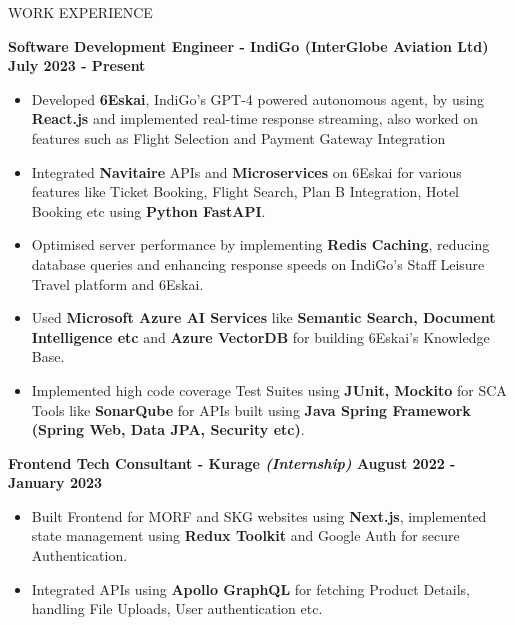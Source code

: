 \documentclass{resume} %
\begin{document}





\begin{rSection}{WORK EXPERIENCE}

{\bf Software Development Engineer - IndiGo (InterGlobe Aviation Ltd)  \hfill July 2023 - Present }
\begin{itemize}
    \item {\normalfont Developed \textbf{6Eskai}, IndiGo's GPT-4 powered autonomous agent, by using \textbf{React.js} and implemented real-time response streaming, also worked on features such as Flight Selection and Payment Gateway Integration}
    \item{\normalfont Integrated \textbf{Navitaire} APIs and \textbf{Microservices} on 6Eskai for various features like Ticket Booking, Flight Search, Plan B Integration, Hotel Booking etc using \textbf{Python FastAPI}.}
    \item {\normalfont Optimised server performance by implementing \textbf{Redis Caching}, reducing database queries and enhancing response speeds on IndiGo’s Staff Leisure Travel platform and 6Eskai.}
    \item {\normalfont Used \textbf{Microsoft Azure AI Services} like \textbf{Semantic Search, Document Intelligence etc} and \textbf{Azure VectorDB} for building 6Eskai's Knowledge Base.}
    \item {\normalfont Implemented high code coverage Test Suites using \textbf{JUnit, Mockito} for SCA Tools like \textbf{SonarQube} for APIs built using \textbf{Java Spring Framework (Spring Web, Data JPA, Security etc)}.}
\end{itemize}


{\bf Frontend Tech Consultant - Kurage {\normalfont \emph{(Internship)}}  \hfill August 2022 - January 2023 }
\begin{itemize}

    \item {\normalfont Built Frontend for MORF and SKG websites using \textbf{Next.js}, implemented state management using 
 \textbf{Redux Toolkit} and Google Auth for secure Authentication.}
   \item {\normalfont Integrated APIs using \textbf{{Apollo GraphQL}} for fetching Product Details, handling File Uploads, User authentication etc.} 
\end{itemize}

\end{rSection}
\end{document}

